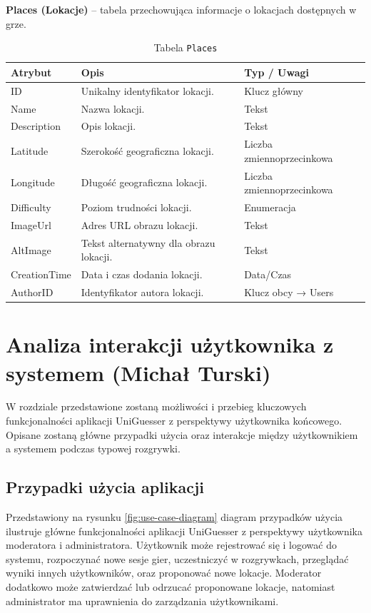 \textbf{Places (Lokacje)} – tabela przechowująca informacje o lokacjach dostępnych w grze.

\begin{table}[H]
\centering
\renewcommand{\arraystretch}{1.2}
\begin{tabular}{|p{2.5cm}|p{8cm}|p{2.5cm}|}
\hline
\textbf{Atrybut} & \textbf{Opis} & \textbf{Typ / Uwagi} \\ \hline
ID & Unikalny identyfikator lokacji. & Klucz główny \\ \hline
Name & Nazwa lokacji. & Tekst \\ \hline
Description & Opis lokacji. & Tekst \\ \hline
Latitude & Szerokość geograficzna lokacji. & Liczba zmiennoprzecinkowa \\ \hline
Longitude & Długość geograficzna lokacji. & Liczba zmiennoprzecinkowa \\ \hline
Difficulty & Poziom trudności lokacji. & Enumeracja \\ \hline
ImageUrl & Adres URL obrazu lokacji. & Tekst \\ \hline
AltImage & Tekst alternatywny dla obrazu lokacji. & Tekst \\ \hline
CreationTime & Data i czas dodania lokacji. & Data/Czas \\ \hline
AuthorID & Identyfikator autora lokacji. & Klucz obcy → Users \\ \hline
\end{tabular}
\caption{Tabela \texttt{Places}}
\end{table}

\section{Analiza interakcji użytkownika z systemem (Michał Turski)}
W rozdziale przedstawione zostaną możliwości i przebieg kluczowych funkcjonalności aplikacji UniGuesser z perspektywy użytkownika końcowego. Opisane zostaną główne przypadki użycia oraz interakcje między użytkownikiem a systemem podczas typowej rozgrywki.

\subsection{Przypadki użycia aplikacji}
Przedstawiony na rysunku \ref{fig:use-case-diagram} diagram przypadków użycia ilustruje główne funkcjonalności aplikacji UniGuesser z perspektywy użytkownika moderatora i administratora. Użytkownik może rejestrować się i logować do systemu, rozpoczynać nowe sesje gier, uczestniczyć w rozgrywkach, przeglądać wyniki innych użytkowników, oraz proponować nowe lokacje. Moderator dodatkowo może zatwierdzać lub odrzucać proponowane lokacje, natomiast administrator ma uprawnienia do zarządzania użytkownikami.

